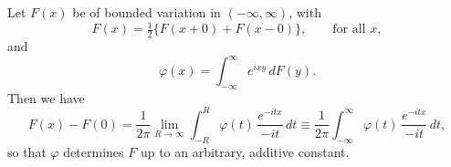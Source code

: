 \begin{theorem}\label{thm:III-1}
Let $F(x)$ be of bounded variation in $(-\infty,\infty)$, with
\begin{equation}\tag{1.3}\label{eq:III-1.3}
F(x)=\tfrac12\bigl\{F(x+0)+F(x-0)\bigr\},\qquad\text{for all }x,
\end{equation}
and
\begin{equation}\tag{1.4}\label{eq:III-1.4}
\varphi(x)=\int_{-\infty}^{\infty}e^{ixy}\,dF(y).
\end{equation}
Then we have
\begin{equation}\tag{1.5}\label{eq:III-1.5}
F(x)-F(0)=\frac{1}{2\pi}\lim_{R\to\infty}\int_{-R}^{R}\varphi(t)\,\frac{e^{-itx}}{-it}\,dt
\equiv\frac{1}{2\pi}\int_{-\infty}^{\infty}\varphi(t)\,\frac{e^{-itx}}{-it}\,dt,
\end{equation}
so that $\varphi$ determines $F$ up to an arbitrary, additive constant.
\end{theorem}

